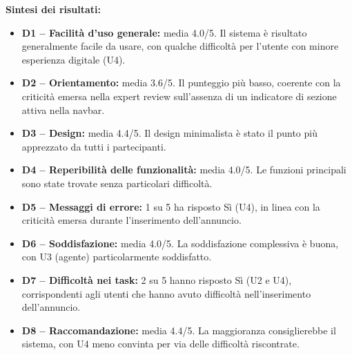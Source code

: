 \documentclass{article}
\begin{document}
\textbf{Sintesi dei risultati:}
\begin{itemize}
    \item \textbf{D1 -- Facilità d'uso generale:} media 4.0/5. Il sistema 
    è risultato generalmente facile da usare, con qualche difficoltà 
    per l'utente con minore esperienza digitale (U4).
    \item \textbf{D2 -- Orientamento:} media 3.6/5. Il punteggio più basso, 
    coerente con la criticità emersa nella expert review sull'assenza 
    di un indicatore di sezione attiva nella navbar.
    \item \textbf{D3 -- Design:} media 4.4/5. Il design minimalista è stato 
    il punto più apprezzato da tutti i partecipanti.
    \item \textbf{D4 -- Reperibilità delle funzionalità:} media 4.0/5. 
    Le funzioni principali sono state trovate senza particolari difficoltà.
    \item \textbf{D5 -- Messaggi di errore:} 1 su 5 ha risposto Sì (U4), 
    in linea con la criticità emersa durante l'inserimento dell'annuncio.
    \item \textbf{D6 -- Soddisfazione:} media 4.0/5. La soddisfazione 
    complessiva è buona, con U3 (agente) particolarmente soddisfatto.
    \item \textbf{D7 -- Difficoltà nei task:} 2 su 5 hanno risposto Sì 
    (U2 e U4), corrispondenti agli utenti che hanno avuto difficoltà 
    nell'inserimento dell'annuncio.
    \item \textbf{D8 -- Raccomandazione:} media 4.4/5. La maggioranza 
    consiglierebbe il sistema, con U4 meno convinta per via delle 
    difficoltà riscontrate.
\end{itemize}
\end{document}
